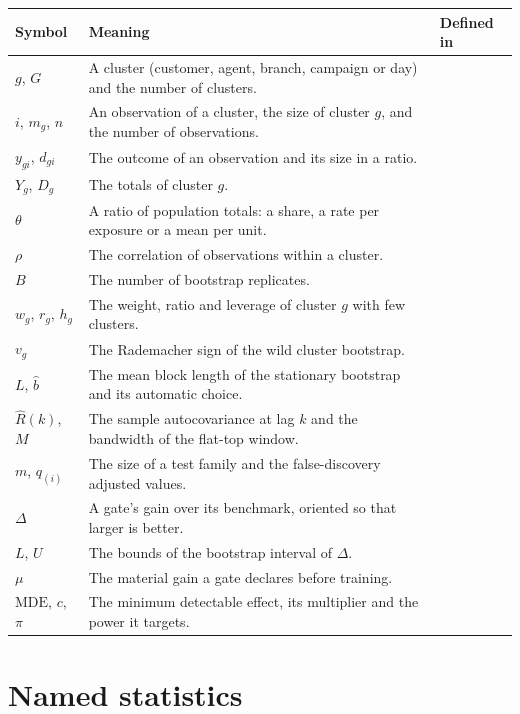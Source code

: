 {\small
\begin{longtable}{@{}QVZ@{}}
\toprule
Symbol & Meaning & Defined in \\
\midrule
\endhead
\bottomrule
\endfoot
$g$, $G$ & A cluster (customer, agent, branch, campaign or day) and the number of clusters. &  \\
$i$, $m_g$, $n$ & An observation of a cluster, the size of cluster $g$, and the number of observations. &  \\
$y_{gi}$, $d_{gi}$ & The outcome of an observation and its size in a ratio. &  \\
$Y_g$, $D_g$ & The totals of cluster $g$. &  \\
$\theta$ & A ratio of population totals: a share, a rate per exposure or a mean per unit. &  \\
$\rho$ & The correlation of observations within a cluster. &  \\
$B$ & The number of bootstrap replicates. &  \\
$w_g$, $r_g$, $h_g$ & The weight, ratio and leverage of cluster $g$ with few clusters. &  \\
$v_g$ & The Rademacher sign of the wild cluster bootstrap. &  \\
$L$, $\hat b$ & The mean block length of the stationary bootstrap and its automatic choice. &  \\
$\hat R(k)$, $M$ & The sample autocovariance at lag $k$ and the bandwidth of the flat-top window. &  \\
$m$, $q_{(i)}$ & The size of a test family and the false-discovery adjusted values. &  \\
$\Delta$ & A gate's gain over its benchmark, oriented so that larger is better. &  \\
$L$, $U$ & The bounds of the bootstrap interval of $\Delta$. &  \\
$\mu$ & The material gain a gate declares before training. &  \\
$\mathrm{MDE}$, $c$, $\pi$ & The minimum detectable effect, its multiplier and the power it targets. &  \\
\end{longtable}}

\section{Named statistics}

